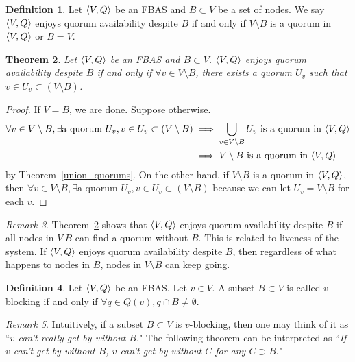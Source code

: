 \documentclass[12pt, psamsfonts]{amsart}
\newtheorem{thm}{Theorem}[section]
\theoremstyle{definition}
\newtheorem{defn}[thm]{Definition}
\theoremstyle{remark}
\newtheorem{rem}[thm]{Remark}
\numberwithin{equation}{section}
\begin{document}
\begin{defn}\label{def_quorum_availability}
    Let $\ev{V, Q}$ be an FBAS and $B \subset V$ be a set of nodes.
    We say $\ev{V, Q}$ enjoys quorum availability despite $B$ if and only if $V \setminus B$ is a quorum in $\ev{V, Q}$ or $B = V$.
\end{defn}

\begin{thm}\label{quorum_availability_equivalence_condition}
    Let $\ev{V, Q}$ be an FBAS and $B \subset V$.
    $\ev{V, Q}$ enjoys quorum availability despite $B$ if and only if $\forall v \in V \setminus B$, there exists a quorum $U_v$ such that $v \in U_v \subset (V \setminus B)$.
\end{thm}

\begin{proof}
    If $V = B$, we are done.
    Suppose otherwise.
    \begin{align*}
        \forall v \in V \setminus B, \exists \text{a quorum $U_v$}, v \in U_v \subset (V \setminus B)
            &\implies \bigcup_{v \in V \setminus B} U_v \text{ is a quorum in $\ev{V, Q}$} \\
            &\implies \text{$V \setminus B$ is a quorum in $\ev{V, Q}$}
    \end{align*}
    by Theorem~\ref{union_quorums}.
    On the other hand, if $V \setminus B$ is a quorum in $\ev{V, Q}$, then $\forall v \in V \setminus B, \exists \text{a quorum $U_v$}, v \in U_v \subset (V \setminus B)$ because we can let $U_v = V \setminus B$ for each $v$.
\end{proof}

\begin{rem}
    Theorem~\ref{quorum_availability_equivalence_condition} shows that $\ev{V, Q}$ enjoys quorum availability despite $B$ if all nodes in $V \ B$ can find a quorum without $B$.
    This is related to liveness of the system.
    If $\ev{V, Q}$ enjoys quorum availability despite $B$, then regardless of what happens to nodes in $B$, nodes in $V \setminus B$ can keep going.
\end{rem}

\begin{defn}\label{def_v_blocking}
    Let $\ev{V, Q}$ be an FBAS\@.
    Let $v \in V$.
    A subset $B \subset V$ is called $v$-blocking if and only if $\forall q \in Q(v), q \cap B \ne \emptyset$.
\end{defn}

\begin{rem}
    Intuitively, if a subset $B \subset V$ is $v$-blocking, then one may think of it as ``\textit{$v$ can't really get by without $B$}."
    The following theorem can be interpreted as ``\textit{If $v$ can't get by without $B$, $v$ can't get by without $C$ for any $C \supset B$}."
\end{rem}
\end{document}
